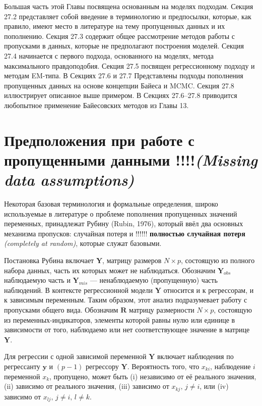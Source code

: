 Большая часть этой Главы посвящена основанным на моделях подходам. Секция 27.2 представляет собой введение в терминологию и предпосылки, которые, как правило, имеют место в литературе на тему пропущенных данных и их пополнению. Секция 27.3 содержит общее рассмотрение методов работы с пропусками в данных, которые не предполагают построения моделей. Секция 27.4 начинается с первого подхода, основанного на моделях, метода максимального правдоподобия. Секция 27.5 посвящен регрессионному подходу и методам EM-типа. В Секциях 27.6 и 27.7 Представлены подходы пополнения пропущенных данных на основе концепции Байеса и MCMC. Секция 27.8 иллюстрирует описанное выше примером. В Секциях 27.6--27.8 приводится любопытное применение Байесовских методов из Главы 13.

\section{Предположения при работе с пропущенными данными !!!!\emph{(Missing data assumptions)}}

Некоторая базовая терминология и формальные определения, широко используемые в литературе о проблеме пополнения пропущенных значений переменных, принадлежат Рубину (Rubin, 1976), который ввёл два основных механизма пропусков: случайная потеря и !!!!!! {\bf полностью случайная потеря} \emph{(completely at random)}, которые служат базовыми. 

Постановка Рубина включает $\mathbf{Y}$, матрицу размеров $N \times p$, состоящую из полного набора данных, часть их которых может не наблюдаться. Обозначим $\mathbf{Y}_{obs}$ наблюдаемую часть и $\mathbf{Y}_{mis}$ --- ненаблюдаемую (пропущенную) часть наблюдений. В контексте регрессионной модели $\mathbf{Y}$ относится и к регрессорам, и к зависимым переменным. Таким образом, этот анализ подразумевает работу с пропусками общего вида. Обозначим $\mathbf{R}$ матрицу размерности $N \times p$, состоящую из переменных-индикаторов, элементы которой равны нулю или единице в зависимости от того, наблюдаемо или нет соответствующее значение в матрице $\mathbf{Y}$.

Для регрессии с одной зависимой переменной $\mathbf{Y}$ включает наблюдения по регрессанту $\mathbf{y}$ и $(p-1)$ регрессору $\mathbf{Y}$. Вероятность того, что $x_{ki}$, наблюдение $i$ переменной $x_k$, пропущено, может быть (i) независимо от её реального значения, (ii) зависимо от реального значения, (iii) зависимо от $x_{kj}, \, j \neq i$, или (iv) зависимо от $x_{lj}, \, j \neq i, \, l \neq k$.

